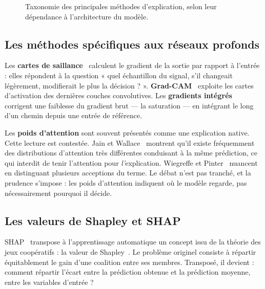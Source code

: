 \begin{figure}[H]
\vspace{0.3cm}
\caption[Taxonomie des méthodes d'explication]%
        {Taxonomie des principales méthodes d'explication, selon leur dépendance à
         l'architecture du modèle.}
\label{fig:xai-taxo}
\end{figure}

\subsection{Les méthodes spécifiques aux réseaux profonds}

Les \textbf{cartes de saillance}~\cite{simonyan2014} calculent le gradient de la sortie
par rapport à l'entrée : elles répondent à la question « quel échantillon du signal,
s'il changeait légèrement, modifierait le plus la décision ? ».
\textbf{Grad-CAM}~\cite{selvaraju2017} exploite les cartes d'activation des dernières
couches convolutives. Les \textbf{gradients intégrés}~\cite{sundararajan2017} corrigent
une faiblesse du gradient brut — la saturation — en intégrant le long d'un chemin
depuis une entrée de référence.

Les \textbf{poids d'attention} sont souvent présentés comme une explication native.
Cette lecture est contestée. Jain et Wallace~\cite{jain2019} montrent qu'il existe
fréquemment des distributions d'attention très différentes conduisant à la même
prédiction, ce qui interdit de tenir l'attention pour \emph{l'}explication. Wiegreffe
et Pinter~\cite{wiegreffe2019} nuancent en distinguant plusieurs acceptions du terme.
Le débat n'est pas tranché, et la prudence s'impose : les poids d'attention indiquent
où le modèle regarde, pas nécessairement pourquoi il décide.

\subsection{Les valeurs de Shapley et SHAP}

SHAP~\cite{lundberg2017} transpose à l'apprentissage automatique un concept issu de la
théorie des jeux coopératifs : la valeur de Shapley~\cite{shapley1953}. Le problème
originel consiste à répartir équitablement le gain d'une coalition entre ses membres.
Transposé, il devient : comment répartir l'écart entre la prédiction obtenue et la
prédiction moyenne, entre les variables d'entrée ?

